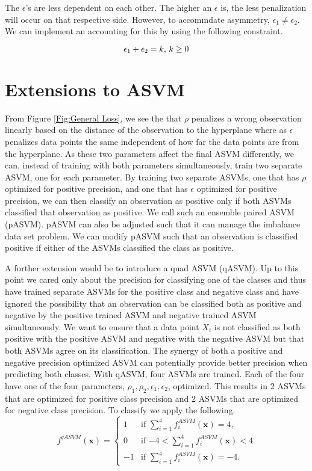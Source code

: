 \documentclass[twoside,11pt]{article}
\begin{document}
The $\epsilon$'s are less dependent on each other. The higher an $\epsilon$ is, the less penalization will occur on that respective side. However, to accommdate asymmetry, $\epsilon_1 \neq \epsilon_2$. We can implement an accounting for this by using the following constraint.

\begin{equation}\label{epsilon constraint}
\epsilon_1 + \epsilon_2=k \\
\text{, } k \geq 0
\end{equation}

\section{Extensions to ASVM}
From Figure \ref{Fig:General Loss}, we see the that $\rho$ penalizes a wrong observation linearly based on the distance of the observation to the hyperplane where as $\epsilon$ penalizes data points the same independent of how far the data points are from the hyperplane. As these two parameters affect the final ASVM differently, we can, instead of training with both parameters simultaneously, train two separate ASVM, one for each parameter. By training two separate ASVMs, one that has $\rho$ optimized for positive precision, and one that has $\epsilon$ optimized for positive precision, we can then classify an observation as positive only if both ASVMs classified that observation as positive. We call such an ensemble paired ASVM (pASVM). pASVM can also be adjusted such that it can manage the imbalance data set problem. We can modify pASVM such that an observation is classified positive if either of the ASVMs classified the class as positive. 


A further extension would be to introduce a quad ASVM (qASVM). Up to this point we cared only about the precision for classifying one of the classes and thus have trained separate ASVMs for the positive class and negative class and have ignored the possibility that an observation can be classified both as positive and negative by the positive trained ASVM and negative trained ASVM simultaneously. We want to ensure that a data point $X_i$ is not classified as both positive with the positive ASVM and negative with the negative ASVM but that both ASVMs agree on its classification. The synergy of both a positive and negative precision optimized ASVM can potentially provide better precision when predicting both classes. With qASVM, four ASVMs are trained. Each of the four have one of the four parameters, $\rho_1,\rho_2,\epsilon_1,\epsilon_2$, optimized. This results in 2 ASVMs that are optimized for positive class precision and 2 ASVMs that are optimized for negative class precision. To classify we apply the following.
\begin{equation}
	f^{qASVM}(\mathbf{x})=\begin{cases} 1 & \text{if $\sum_{i=1}^4 f^{ASVM}_i(\mathbf{x}) = 4$,}
\\
0 & \text{if $-4 <\sum_{i=1}^4 f^{ASVM}_i(\mathbf{x})<4$}\\
 -1  &\text{if $\sum_{i=1}^4 f^{ASVM}_i(\mathbf{x})=-4$.}
	\end{cases}
\end{equation}
\end{document}
